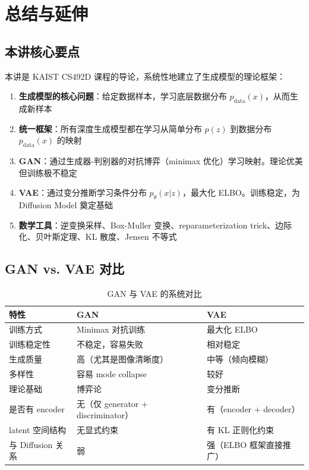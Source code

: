 \section{总结与延伸}

\subsection{本讲核心要点}

本讲是 KAIST CS492D 课程的导论，系统性地建立了生成模型的理论框架：

\begin{enumerate}
    \item \textbf{生成模型的核心问题}：给定数据样本，学习底层数据分布 $p_{\text{data}}(x)$，从而生成新样本
    \item \textbf{统一框架}：所有深度生成模型都在学习从简单分布 $p(z)$ 到数据分布 $p_{\text{data}}(x)$ 的映射
    \item \textbf{GAN}：通过生成器-判别器的对抗博弈（minimax 优化）学习映射。理论优美但训练极不稳定
    \item \textbf{VAE}：通过变分推断学习条件分布 $p_\theta(x|z)$，最大化 ELBO。训练稳定，为 Diffusion Model 奠定基础
    \item \textbf{数学工具}：逆变换采样、Box-Muller 变换、reparameterization trick、边际化、贝叶斯定理、KL 散度、Jensen 不等式
\end{enumerate}

\subsection{GAN vs. VAE 对比}

\begin{table}[H]
\centering
\begin{tabular}{lll}
\toprule
特性 & GAN & VAE \\
\midrule
训练方式 & Minimax 对抗训练 & 最大化 ELBO \\
训练稳定性 & 不稳定，容易失败 & 相对稳定 \\
生成质量 & 高（尤其是图像清晰度） & 中等（倾向模糊） \\
多样性 & 容易 mode collapse & 较好 \\
理论基础 & 博弈论 & 变分推断 \\
是否有 encoder & 无（仅 generator + discriminator） & 有（encoder + decoder） \\
latent 空间结构 & 无显式约束 & 有 KL 正则化约束 \\
与 Diffusion 关系 & 弱 & 强（ELBO 框架直接推广） \\
\bottomrule
\end{tabular}
\caption{GAN 与 VAE 的系统对比}
\end{table}

